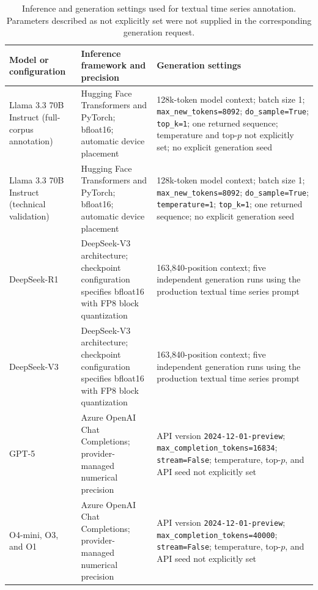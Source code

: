 \begin{table}[!htbp]
\centering
\caption{
Inference and generation settings used for textual time series annotation.
Parameters described as not explicitly set were not supplied in the
corresponding generation request.
}
\label{tab:inference-settings}
\scriptsize
\setlength{\tabcolsep}{5pt}
\renewcommand{\arraystretch}{1.18}
\begin{tabular}{
    p{}
    p{}
    p{}
}
\toprule
\textbf{Model or configuration} &
\textbf{Inference framework and precision} &
\textbf{Generation settings} \\
\midrule

Llama 3.3 70B Instruct
(full-corpus annotation) &
Hugging Face Transformers and PyTorch;
bfloat16;
automatic device placement &
128k-token model context;
batch size 1;
\texttt{max\_new\_tokens=8092};
\texttt{do\_sample=True};
\texttt{top\_k=1};
one returned sequence;
temperature and top-$p$ not explicitly set;
no explicit generation seed \\

Llama 3.3 70B Instruct
(technical validation) &
Hugging Face Transformers and PyTorch;
bfloat16;
automatic device placement &
128k-token model context;
batch size 1;
\texttt{max\_new\_tokens=8092};
\texttt{do\_sample=True};
\texttt{temperature=1};
\texttt{top\_k=1};
one returned sequence;
no explicit generation seed \\

DeepSeek-R1 &
DeepSeek-V3 architecture;
checkpoint configuration specifies bfloat16 with FP8 block quantization &
163{,}840-position context;
five independent generation runs using the production textual time series
prompt \\

DeepSeek-V3 &
DeepSeek-V3 architecture;
checkpoint configuration specifies bfloat16 with FP8 block quantization &
163{,}840-position context;
five independent generation runs using the production textual time series
prompt \\

GPT-5 &
Azure OpenAI Chat Completions;
provider-managed numerical precision &
API version \texttt{2024-12-01-preview};
\texttt{max\_completion\_tokens=16834};
\texttt{stream=False};
temperature, top-$p$, and API seed not explicitly set \\

O4-mini, O3, and O1 &
Azure OpenAI Chat Completions;
provider-managed numerical precision &
API version \texttt{2024-12-01-preview};
\texttt{max\_completion\_tokens=40000};
\texttt{stream=False};
temperature, top-$p$, and API seed not explicitly set \\

\bottomrule
\end{tabular}
\end{table}